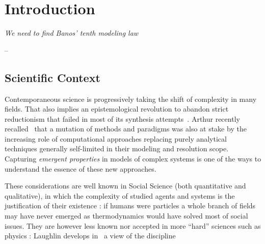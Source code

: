 




%
%
%
%


\chapter*{Introduction}

\bigskip

{\raggedright\textit{We need to find Banos' tenth modeling law}
\raggedright-- 
}


\bigskip




\section*{Scientific Context}


Contemporaneous science is progressively taking the shift of complexity in many fields. That also implies an epistemological revolution to abandon strict reductionism that failed in most of its synthesis attempts~\cite{anderson1972more}. Arthur recently recalled~\cite{arthur2015complexity} that a mutation of methods and paradigms was also at stake by the increasing role of computational approaches replacing purely analytical techniques generally self-limited in their modeling and resolution scope. Capturing \emph{emergent properties} in models of complex systems is one of the ways to understand the essence of these new approaches.

These considerations are well known in Social Science (both quantitative and qualitative), in which the complexity of studied agents and systems is the justification of their existence : if humans were particles a whole branch of fields may have never emerged as thermodynamics would have solved most of social issues.  
They are however less known nor accepted in more ``hard'' sciences such as physics : Laughlin develops in~\cite{laughlin2006different} a view of the discipline








